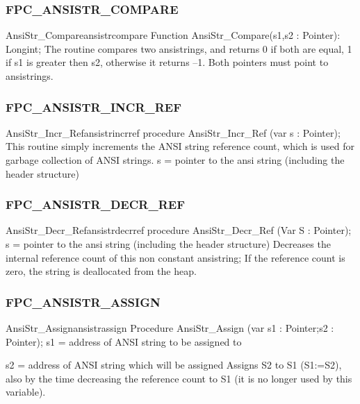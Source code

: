 \documentclass [12pt]{article}
\begin{document}
\subsubsection{FPC{\_}ANSISTR{\_}COMPARE}
\label{subsubsec:mylabel40}

\begin{functionl}{AnsiStr{\_}Compare}{ansistrcompare}
\Declaration
Function AnsiStr{\_}Compare(s1,s2 : Pointer): Longint;
\Description 
The routine compares two ansistrings, and returns 0 if both are equal, 1 if
\textsf{s1} is greater then \textsf{s2}, otherwise it returns --1.
\Parameters 
Both pointers must point to ansistrings. 
\end{functionl}

\subsubsection{FPC{\_}ANSISTR{\_}INCR{\_}REF }
\label{subsubsec:mylabel41}

\begin{procedurel}{AnsiStr{\_}Incr{\_}Ref}{ansistrincrref}
\Declaration
procedure AnsiStr{\_}Incr{\_}Ref (var s : Pointer);
\Description 
This routine simply increments the ANSI string reference count, which is
used for garbage collection of ANSI strings.
\Parameters 
s = pointer to the ansi string (including the header structure) 
\end{procedurel}

\subsubsection{FPC{\_}ANSISTR{\_}DECR{\_}REF }
\label{subsubsec:mylabel42}

\begin{procedurel}{AnsiStr{\_}Decr{\_}Ref}{ansistrdecrref}
\Declaration
procedure AnsiStr{\_}Decr{\_}Ref (Var S : Pointer);
\Parameters 
s = pointer to the ansi string (including the header structure) 
\Algorithm
Decreases the internal reference count of this non constant ansistring; If
the reference count is zero, the string is deallocated from the
heap.
\end{procedurel}

\subsubsection{FPC{\_}ANSISTR{\_}ASSIGN }
\label{subsubsec:mylabel43}

\begin{functionl}{AnsiStr{\_}Assign}{ansistrassign}
\Declaration
Procedure AnsiStr{\_}Assign (var s1 : Pointer;s2 : Pointer);
\Parameters 
s1 = address of ANSI string to be assigned to  \par
s2 = address of ANSI string which will be assigned 
\Algorithm
Assigns S2 to S1 (S1:=S2), also by the time decreasing the reference count
to S1 (it is no longer used by this variable).
\end{functionl}
\end{document}
